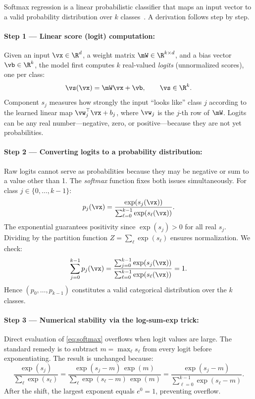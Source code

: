 \documentclass[sigconf,screen,nonacm]{acmart}
\begin{document}
Softmax regression is a linear probabilistic classifier that maps an input vector to a valid probability distribution over $k$ classes~\cite{murphy2022pml,deisenroth2020mml}. A derivation follows step by step.

\paragraph{Step 1 --- Linear score (logit) computation:}
Given an input $\vx \in \R^d$, a weight matrix $\mW \in \R^{k \times d}$, and a bias vector $\vb \in \R^k$, the model first computes $k$ real-valued \emph{logits} (unnormalized scores), one per class:
\begin{equation}
    \vs(\vx) = \mW\vx + \vb, \qquad \vs \in \R^k.
    \label{eq:logits}
\end{equation}
Component $s_j$ measures how strongly the input ``looks like'' class $j$ according to the learned linear map $\vw_j^\top \vx + b_j$, where $\vw_j$ is the $j$-th row of $\mW$. Logits can be any real number---negative, zero, or positive---because they are not yet probabilities.

\paragraph{Step 2 --- Converting logits to a probability distribution:}
Raw logits cannot serve as probabilities because they may be negative or sum to a value other than 1. The \emph{softmax} function fixes both issues simultaneously. For class $j \in \{0, \ldots, k-1\}$:
\begin{equation}
    p_j(\vx) = \frac{\exp(s_j(\vx))}{\sum_{\ell=0}^{k-1} \exp(s_{\ell}(\vx))}.
    \label{eq:softmax}
\end{equation}
The exponential guarantees positivity since $\exp(s_j) > 0$ for all real $s_j$. Dividing by the partition function $Z = \sum_\ell \exp(s_\ell)$ ensures normalization. We check:
\begin{equation}
    \sum_{j=0}^{k-1} p_j(\vx)
    = \frac{\sum_{j=0}^{k-1} \exp(s_j(\vx))}{\sum_{\ell=0}^{k-1} \exp(s_\ell(\vx))} = 1.
    \label{eq:softmax-sum-to-one}
\end{equation}
Hence $(p_0, \ldots, p_{k-1})$ constitutes a valid categorical distribution over the $k$ classes.

\paragraph{Step 3 --- Numerical stability via the log-sum-exp trick:}
Direct evaluation of \cref{eq:softmax} overflows when logit values are large. The standard remedy is to subtract $m = \max_\ell s_\ell$ from every logit before exponentiating. The result is unchanged because:
\begin{equation}
    \frac{\exp(s_j)}{\sum_\ell \exp(s_\ell)}
    = \frac{\exp(s_j - m)\,\exp(m)}{\sum_\ell \exp(s_\ell - m)\,\exp(m)}
    = \frac{\exp(s_j - m)}{\sum_{\ell=0}^{k-1} \exp(s_\ell - m)}.
    \label{eq:softmax-stable}
\end{equation}
After the shift, the largest exponent equals $e^0 = 1$, preventing overflow.
\end{document}

